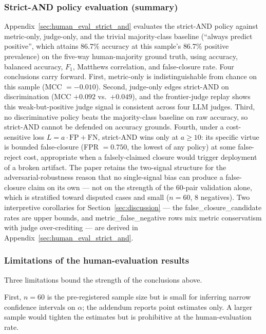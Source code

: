 \subsubsection{Strict-AND policy evaluation (summary)}
\label{sec:human_eval_strict_and_summary}

Appendix~\ref{sec:human_eval_strict_and} evaluates the strict-AND
policy against metric-only, judge-only, and the trivial majority-class
baseline (``always predict positive'', which attains $86.7\%$ accuracy
at this sample's $86.7\%$ positive prevalence) on the five-way
human-majority ground truth, using accuracy, balanced accuracy, $F_1$,
Matthews correlation, and false-closure rate. Four conclusions carry
forward. First, metric-only is indistinguishable from chance on this
sample (MCC $= -0.010$). Second, judge-only edges strict-AND on
discrimination (MCC $+0.092$ vs.\ $+0.049$), and the frontier-judge
replay shows this weak-but-positive judge signal is consistent across
four LLM judges. Third, no discriminative policy beats the
majority-class baseline on raw accuracy, so strict-AND cannot be
defended on accuracy grounds. Fourth, under a cost-sensitive loss
$L = a \cdot \mathrm{FP} + \mathrm{FN}$, strict-AND wins only at
$a \geq 10$: its specific virtue is bounded false-closure
(FPR $= 0.750$, the lowest of any policy) at some false-reject cost,
appropriate when a falsely-claimed closure would trigger deployment of
a broken artifact. The paper retains the two-signal structure for the
adversarial-robustness reason that no single-signal bias can produce a
false-closure claim on its own --- not on the strength of the 60-pair
validation alone, which is stratified toward disputed cases and small
($n = 60$, 8 negatives). Two interpretive corollaries for
Section~\ref{sec:discussion} --- the \textsf{false\_closure\_candidate}
rates are upper bounds, and \textsf{metric\_false\_negative} rows mix
metric conservatism with judge over-crediting --- are derived in
Appendix~\ref{sec:human_eval_strict_and}.

\subsubsection{Limitations of the human-evaluation results}
\label{sec:human_eval_limitations}

Three limitations bound the strength of the conclusions above.

First, $n = 60$ is the pre-registered sample size but is small for
inferring narrow confidence intervals on $\alpha$; the addendum reports
point estimates only. A larger sample would tighten the estimates but is
prohibitive at the human-evaluation rate.

